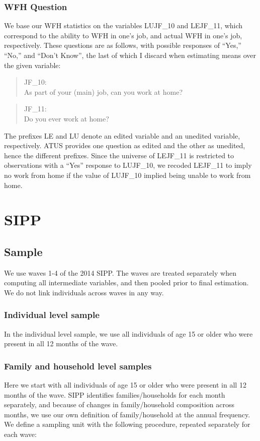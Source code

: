 \documentclass{article}
\begin{document}
\subsubsection{WFH Question}
We base our WFH statistics on the variables LUJF\_10 and LEJF\_11, which correspond to the ability to WFH in one's job, and actual WFH in one's job, respectively. These questions are as follows, with possible responses of ``Yes,'' ``No,'' and ``Don't Know'', the last of which I discard when estimating means over the given variable:
\begin{quote}
JF\_10: \\
As part of your (main) job, can you work at home?
\end{quote}
\begin{quote}
JF\_11: \\
Do you ever work at home?
\end{quote}

The prefixes LE and LU denote an edited variable and an unedited variable, respectively. ATUS provides one question as edited and the other as unedited, hence the different prefixes. Since the universe of LEJF\_11 is restricted to observations with a ``Yes'' response to LUJF\_10, we recoded LEJF\_11 to imply no work from home if the value of LUJF\_10 implied being unable to work from home.

\section{SIPP}
\subsection{Sample}
We use waves 1-4 of the 2014 SIPP. The waves are treated separately when computing all intermediate variables, and then pooled prior to final estimation. We do not link individuals across waves in any way.

\subsubsection{Individual level sample}
In the individual level sample, we use all individuals of age 15 or older who were present in all 12 months of the wave.

\subsubsection{Family and household level samples}
Here we start with all individuals of age 15 or older who were present in all 12 months of the wave. SIPP identifies families/households for each month separately, and because of changes in family/household composition across months, we use our own definition of family/household at the annual frequency. We define a sampling unit with the following procedure, repeated separately for each wave:
\end{document}
